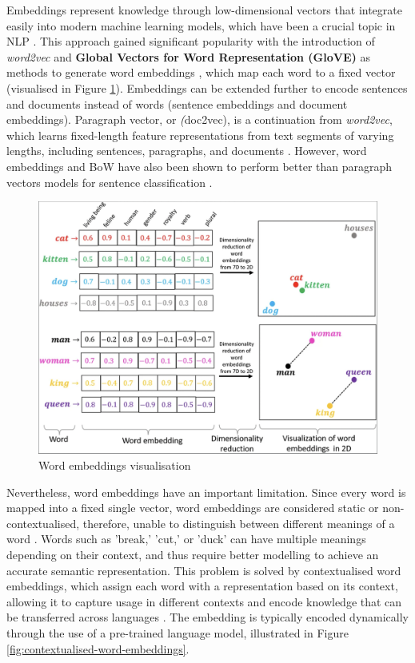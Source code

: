 Embeddings represent knowledge through low-dimensional vectors that integrate easily into modern machine learning models, which have been a crucial topic in NLP \cite{camacho-collados-2020-embeddings}. This approach gained significant popularity with the introduction of \textit{word2vec} and \textbf{Global Vectors for Word Representation (GloVE)} \cite{pennington-2014-glove} as methods to generate word embeddings \cite{mikolov-2013-embeddings}, which map each word to a fixed vector (visualised in Figure \ref{fig:word-embeddings}). Embeddings can be extended further to encode sentences and documents instead of words (sentence embeddings and document embeddings). Paragraph vector, or \textit(doc2vec), is a continuation from \textit{word2vec}, which learns fixed-length feature representations from text segments of varying lengths, including sentences, paragraphs, and documents \cite{mikolov-2014-doc2vec}. However, word embeddings and BoW have also been shown to perform better than paragraph vectors models for sentence classification \cite{white-2015-how-well-sentence-embeddings}.

\begin{figure}[htbp]
    \centering
    \includegraphics[width=0.8\linewidth]{images/word_embeddings.png}
    \caption{Word embeddings visualisation \cite{narayanan-2019-word-embeddings}}
    \label{fig:word-embeddings}
\end{figure}


Nevertheless, word embeddings have an important limitation. Since every word is mapped into a fixed single vector, word embeddings are considered static or non-contextualised, therefore, unable to distinguish between different meanings of a word \cite{camacho-collados-2020-embeddings}. Words such as 'break,' 'cut,' or 'duck' can have multiple meanings depending on their context, and thus require better modelling to achieve an accurate semantic representation. This problem is solved by contextualised word embeddings, which assign each word with a representation based on its context, allowing it to capture usage in different contexts and encode knowledge that can be transferred across languages \cite{liu-2020-survey-contextual-embeddings}. The embedding is typically encoded dynamically through the use of a pre-trained language model, illustrated in Figure \ref{fig:contextualised-word-embeddings}.



